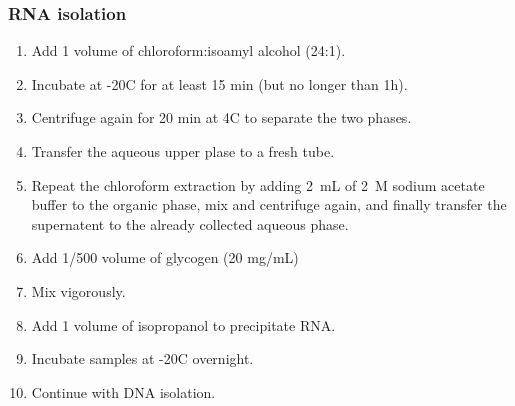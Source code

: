 \subsubsection{RNA isolation}
\begin{enumerate}
\item Add 1 volume of chloroform:isoamyl alcohol (24:1).
\item Incubate at -20\degree C for at least 15 min (but no longer than 1h).
\item Centrifuge again for 20 min at 4\degree C to separate the two phases.
\item Transfer the aqueous upper plase to a fresh tube.
\item Repeat the chloroform extraction by adding 2~mL of 2~M sodium acetate buffer to the organic phase, mix and centrifuge again, and finally transfer the supernatent to the already collected aqueous phase.
\item Add 1/500 volume of glycogen (20 mg/mL) 
\item Mix vigorously.
\item Add 1 volume of isopropanol to precipitate RNA.
\item Incubate samples at -20\degree C overnight. 
\item Continue with DNA isolation.
\end{enumerate}

